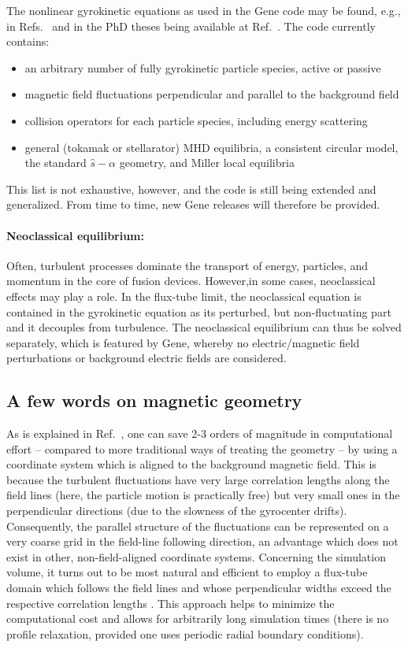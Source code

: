 \documentclass[12pt]{article}
\begin{document}
The nonlinear gyrokinetic equations as used in the {\sc Gene} code
may be found, e.g., in Refs.~\cite{gene1,gene2} and in the PhD theses being available at
Ref.~\cite{GENE-webpage}. The code currently contains:
\begin{itemize}
\item an arbitrary number of fully gyrokinetic particle species, active or passive
\item magnetic field fluctuations perpendicular and parallel to the background field
\item collision operators for each particle species, including energy scattering
\item general (tokamak or stellarator) MHD equilibria, a consistent circular model, the
  standard $\hat s-\alpha$ geometry, and Miller local equilibria
\end{itemize}
This list is not exhaustive, however, and the code is still being extended and generalized.
From time to time, new {\sc Gene} releases will therefore be provided.

\paragraph{Neoclassical equilibrium:}

Often, turbulent processes dominate the transport of energy, particles, and momentum
in the core of fusion devices. However,in some cases, neoclassical effects may play a role.
In the flux-tube limit, the neoclassical equation is contained in the
gyrokinetic equation
as its perturbed, but non-fluctuating part and it decouples from turbulence.
The neoclassical equilibrium can thus be solved separately, which is
featured by {\sc Gene}, whereby no electric/magnetic field perturbations or background
electric fields are considered.

\subsection{A few words on magnetic geometry}

As is explained in Ref.~\cite{beer}, one can save 2-3 orders of
magnitude in computational effort -- compared to more traditional
ways of treating the geometry -- by using a coordinate system
which is aligned to the background magnetic field. This is because
the turbulent fluctuations have very large correlation lengths
along the field lines (here, the particle motion is practically
free) but very small ones in the perpendicular directions (due to
the slowness of the gyrocenter drifts). Consequently, the parallel
structure of the fluctuations can be represented on a very coarse
grid in the field-line following direction, an advantage which
does not exist in other, non-field-aligned coordinate systems.
Concerning the simulation volume, it turns out to be most natural
and efficient to employ a flux-tube domain which follows the field
lines and whose perpendicular widths exceed the respective
correlation lengths \cite{beer}. This approach helps to minimize
the computational cost and allows for arbitrarily long simulation
times (there is no profile relaxation, provided one uses periodic
radial boundary conditions).
\end{document}
